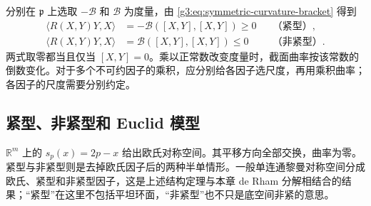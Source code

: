 \ProseParagraphBreak

分别在 \(\mathfrak p\) 上选取 \(-\mathcal B\) 和 \(\mathcal B\) 为度量，由 \eqref{g3:eq:symmetric-curvature-bracket} 得到
\begin{equation}\label{g3:eq:symmetric-sectional-sign}
	\begin{aligned}
	\langle R(X,Y)Y,X\rangle
	&=-\mathcal B([X,Y],[X,Y])\ge0&&\text{（紧型）},\\
	\langle R(X,Y)Y,X\rangle
	&=\mathcal B([X,Y],[X,Y])\le0&&\text{（非紧型）}.
	\end{aligned}
\end{equation}
两式取零都当且仅当 \([X,Y]=0\)。乘以正常数改变度量时，截面曲率按该常数的倒数变化。对于多个不可约因子的乘积，应分别给各因子选尺度，再用乘积曲率；各因子的尺度需要分别约定。

\subsection{紧型、非紧型和 Euclid 模型}
\label{g3:subsec:0504:04}

\(\mathbb R^m\) 上的 \(s_p(x)=2p-x\) 给出欧氏对称空间。其平移方向全部交换，曲率为零。紧型与非紧型则是去掉欧氏因子后的两种半单情形。一般单连通黎曼对称空间分成欧氏、紧型和非紧型因子，这是上述结构定理与本章 de Rham 分解相结合的结果；“紧型”在这里不包括平坦环面，“非紧型”也不只是底空间非紧的意思。


